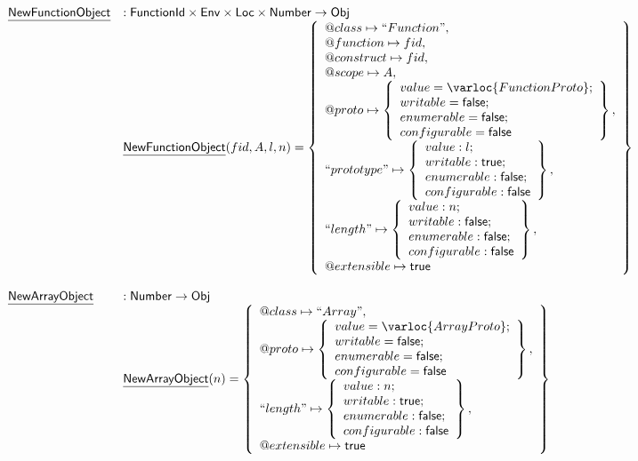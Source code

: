 \[\begin{array}{ll}
\chf{NewFunctionObject} & : \fid \times \SF{Env} \times \SF{Loc} \times \SF{Number} \rightarrow \SF{Obj} \\
& \chf{NewFunctionObject}(fid,A,l,n) = \set{
    \varprop{class}\mapsto ``Function",\\
    \varprop{function}\mapsto fid,\\
    \varprop{construct}\mapsto fid,\\
    \varprop{scope}\mapsto A,\\
    \varprop{proto}\mapsto
    \set{
      value=\varloc{FunctionProto};\\writable=\vfalse;\\
      enumerable=\vfalse;\\configurable=\vfalse
    },\\
    ``prototype"\mapsto \set{
        value:l;\\
        writable:\vtrue;\\
        enumerable:\vfalse;\\
        configurable:\vfalse
      },\\
    ``length"\mapsto \set{
        value:n;\\
        writable:\vfalse;\\
        enumerable:\vfalse;\\
        configurable:\vfalse
      },\\
    \varprop{extensible}\mapsto \vtrue
}\\\\
\chf{NewArrayObject} & : \SF{Number} \rightarrow \SF{Obj} \\
& \chf{NewArrayObject}(n) = \set{
    \varprop{class}\mapsto ``Array",\\
    \varprop{proto}\mapsto 
    \set{
      value=\varloc{ArrayProto};\\writable=\vfalse;\\
      enumerable=\vfalse;\\configurable=\vfalse
    },\\
   ``length"\mapsto \set{
       value:n;\\
       writable:\vtrue;\\
       enumerable:\vfalse;\\
       configurable:\vfalse
     },\\
    \varprop{extensible}\mapsto \vtrue
}\\\\

\end{array}
\]
